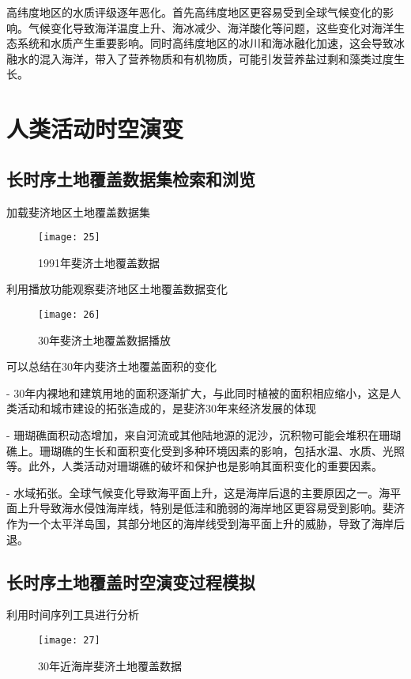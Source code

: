 \documentclass{source/Report}
\begin{document}
高纬度地区的水质评级逐年恶化。首先高纬度地区更容易受到全球气候变化的影响。气候变化导致海洋温度上升、海冰减少、海洋酸化等问题，这些变化对海洋生态系统和水质产生重要影响。同时高纬度地区的冰川和海冰融化加速，这会导致冰融水的混入海洋，带入了营养物质和有机物质，可能引发营养盐过剩和藻类过度生长。

\section{人类活动时空演变}

\subsection{长时序土地覆盖数据集检索和浏览}

加载斐济地区土地覆盖数据集

\begin{figure}[H]
    \centering
    \texttt{[image: 25]}
    \caption{1991年斐济土地覆盖数据}
\end{figure}

利用播放功能观察斐济地区土地覆盖数据变化

\begin{figure}[H]
    \centering
    \texttt{[image: 26]}
    \caption{30年斐济土地覆盖数据播放}
\end{figure}

可以总结在30年内斐济土地覆盖面积的变化

- 30年内裸地和建筑用地的面积逐渐扩大，与此同时植被的面积相应缩小，这是人类活动和城市建设的拓张造成的，是斐济30年来经济发展的体现

- 珊瑚礁面积动态增加，来自河流或其他陆地源的泥沙，沉积物可能会堆积在珊瑚礁上。珊瑚礁的生长和面积变化受到多种环境因素的影响，包括水温、水质、光照等。此外，人类活动对珊瑚礁的破坏和保护也是影响其面积变化的重要因素。

- 水域拓张。全球气候变化导致海平面上升，这是海岸后退的主要原因之一。海平面上升导致海水侵蚀海岸线，特别是低洼和脆弱的海岸地区更容易受到影响。斐济作为一个太平洋岛国，其部分地区的海岸线受到海平面上升的威胁，导致了海岸后退。

\subsection{长时序土地覆盖时空演变过程模拟}

利用时间序列工具进行分析

\begin{figure}[H]
    \centering
    \texttt{[image: 27]}
    \caption{30年近海岸斐济土地覆盖数据}
\end{figure}
\end{document}
